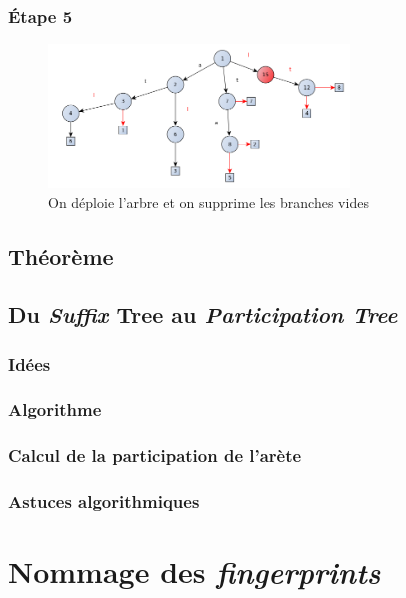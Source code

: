\documentclass[a4paper]{article}
\begin{document}
\subsubsection{Étape 5}

\begin{figure}[ht!]
\centering
\includegraphics[width=80mm]{./slides/img/construction-45.png}
\caption{On déploie l'arbre et on supprime les branches vides}
\label{overflow}
\end{figure}

\subsection{Théorème}

\subsection{Du \emph{Suffix} Tree au \emph{Participation Tree}}

\subsubsection{Idées}

\subsubsection{Algorithme}

\subsubsection{Calcul de la participation de l'arète}

\subsubsection{Astuces algorithmiques}

\section{Nommage des \emph{fingerprints}}
\end{document}
